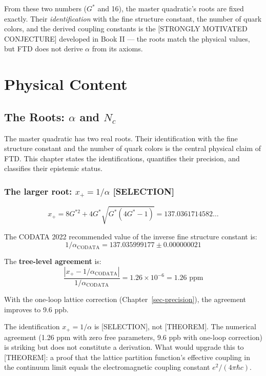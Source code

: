 \documentclass[
  11pt,
  letterpaper,
  twoside,
  openany]{book}
\makeatletter
\let\orig@section\section
\renewcommand{\section}{\needspace{8\baselineskip}\orig@section}
\newcommand{\Gs}{G^{*}{}}
\newcommand{\Gssq}{G^{*2}{}}      %
\makeatother
\begin{document}
From these two numbers (\(\Gs\) and 16), the master quadratic's roots
are fixed exactly. Their \emph{identification} with the fine structure
constant, the number of quark colors, and the derived coupling constants
is the {[}STRONGLY MOTIVATED CONJECTURE{]} developed in Book II --- the
roots match the physical values, but FTD does not derive \(\alpha\) from
its axioms.

\part{Physical Content}

\chapter{\texorpdfstring{The Roots: \(\alpha\) and
\(N_c\)}{The Roots: \textbackslash alpha and N\_c}}\label{sec-roots}

The master quadratic has two real roots. Their identification with the
fine structure constant and the number of quark colors is the central
physical claim of FTD. This chapter states the identifications,
quantifies their precision, and classifies their epistemic status.

\section{\texorpdfstring{The larger root: \(x_+ = 1/\alpha\)
{[}SELECTION{]}}{The larger root: x\_+ = 1/\textbackslash alpha {[}SELECTION{]}}}\label{the-larger-root-x_-1alpha-selection}

\[
x_+ = 8\Gssq + 4\Gs\sqrt{\Gs(4\Gs - 1)} = 137.0361714582\ldots
\]

The CODATA 2022 recommended value of the inverse fine structure constant
is: \[
1/\alpha_{\text{CODATA}} = 137.035999177 \pm 0.000000021
\]

The \textbf{tree-level agreement} is: \[
\frac{|x_+ - 1/\alpha_{\text{CODATA}}|}{1/\alpha_{\text{CODATA}}} = 1.26 \times 10^{-6} = 1.26 \text{ ppm}
\]

With the one-loop lattice correction (Chapter~\ref{sec-precision}), the
agreement improves to 9.6 ppb.

\begin{ftdselection}

The identification \(x_+ = 1/\alpha\) is {[}SELECTION{]}, not
{[}THEOREM{]}. The numerical agreement (1.26 ppm with zero free
parameters, 9.6 ppb with one-loop correction) is striking but does not
constitute a derivation. What would upgrade this to {[}THEOREM{]}: a
proof that the lattice partition function's effective coupling in the
continuum limit equals the electromagnetic coupling constant
\(e^2/(4\pi\hbar c)\).

\end{ftdselection}
\end{document}
